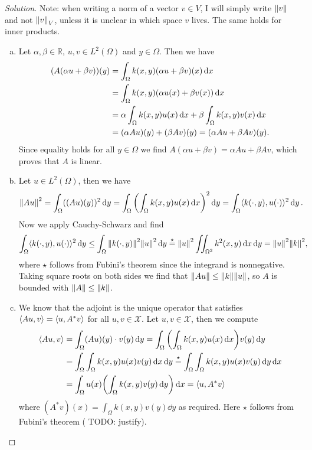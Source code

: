 \documentclass{article}
\theoremstyle{plain}
\theoremstyle{remark}
\newenvironment{solution}{\begin{proof}[Solution]\renewcommand\qedsymbol{}}{\end{proof}}
\newcommand{\Bb}{\mathbb}
\newcommand{\Cal}{\mathcal}
\newcommand{\RR}{\Bb R}
\DeclarePairedDelimiter{\ang}{\langle}{\rangle}
\newcommand\TODO{{\color{red} TODO: }}
\newcommand\XX{\Cal X}
\begin{document}
\begin{solution}
	Note: when writing a norm of a vector $v \in V$, I will simply write $\norm{v}$ and not $\norm{v}_V$, unless it is unclear in which space $v$ lives. The same holds for inner products. 	
	
	\begin{enumerate}[(a)]
		\item Let $\alpha, \beta \in \RR$, $u, v \in L^2(\Omega)$ and $y \in \Omega$. Then we have
		\begin{align*}
			(A(\alpha u + \beta v))(y) &= \int_\Omega k(x, y) (\alpha u + \beta v)(x) \dd{x} \\
			&= \int_\Omega k(x, y) \qty(\alpha u(x) + \beta v(x)) \dd{x}\\
			&= \alpha \int_\Omega k(x, y) u(x) \dd{x} + \beta \int_\Omega k(x, y) v(x) \dd{x} \\
			&= (\alpha A u)(y) + (\beta Av)(y) = (\alpha Au + \beta Av)(y). 
		\end{align*}
	Since equality holds for all $y \in \Omega$ we find $A(\alpha u + \beta v) = \alpha A u + \beta A v$, which proves that $A$ is linear. 
	\item Let $u \in L^2(\Omega)$, then we have
	\begin{align*}
	\norm{Au}^2 &= \int_\Omega ((Au)(y))^2 \dd{y} = \int_\Omega \qty( \int_\Omega k(x, y) u(x) \dd{x})^2 \dd{y} = \int_\Omega \ang{k(\cdot, y), u(\cdot)}^2 \dd{y}. 
	\end{align*}
Now we apply Cauchy-Schwarz and find
\begin{align*}
	\int_\Omega \ang{k(\cdot, y), u(\cdot)}^2 \dd{y} &\leq \int_\Omega \norm{k(\cdot, y)}^2 \norm{u}^2 \dd{y} \overset\star= \norm{u}^2 \iint_{\Omega^2} k^2(x, y) \dd{x}\dd{y} = \norm{u}^2 \norm{k}^2, 
\end{align*}
where $\star$ follows from Fubini's theorem since the integrand is nonnegative. 
Taking square roots on both sides we find that $\norm{Au}\leq \norm{k}\norm{u}$, so $A$ is bounded with $\norm{A} \leq \norm{k}$. 

\item We know that the adjoint is the unique operator that satisfies $\ang{Au, v} = \ang{u, A^*v}$ for all $u, v \in \XX$. Let $u, v \in \XX$, then we compute
\begin{align*}
	\ang{Au, v} &= \int_\Omega (Au)(y)\cdot  v(y) \dd{y} = \int_\Omega \qty(\int_\Omega k(x, y) u(x) \dd{x}) v(y) \dd{y} \\
	&= \int_\Omega\int_\Omega k(x, y) u(x) v(y) \dd{x} \dd{y} \overset\star= \int_\Omega\int_\Omega k(x, y) u(x) v(y) \dd{y} \dd{x} \\
	&= \int_\Omega u(x) \qty(\int_\Omega k(x, y) v(y) \dd{y}) \dd{x} = \ang{u, A^*v}
\end{align*}
where $(A^* v)(x) = \int_\Omega k(x, y) v(y) \dd{y}$ as required. Here $\star$ follows from Fubini's theorem (\TODO justify). 


\end{enumerate}
\end{solution}
\end{document}
